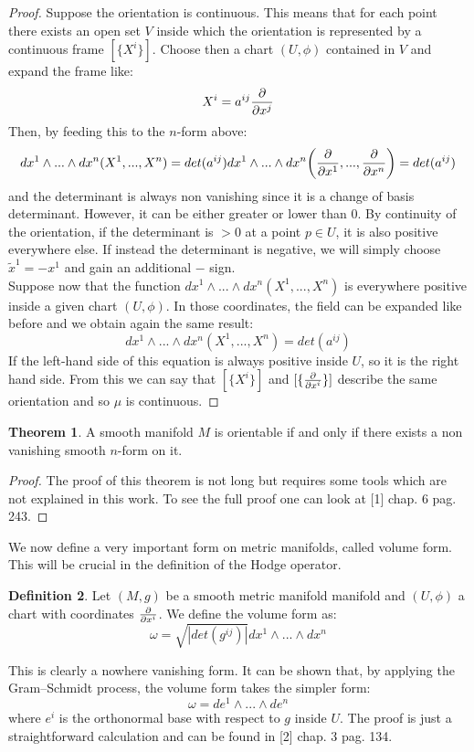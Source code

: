 \documentclass[12pt,a4paper]{report}
\theoremstyle{definition}
\newtheorem{Def}{Definition}[chapter]
\theoremstyle{Theorem}
\newtheorem{Theo}[Def]{Theorem}
\theoremstyle{definition}
\theoremstyle{definition}
\begin{document}
	\begin{proof}
		Suppose the orientation is continuous. This means that for each point there exists an open set $V$ inside which the orientation is represented by a continuous frame $[\{X^i\}]$. Choose then a chart $(U,\phi)$ contained in $V$ and expand the frame like:
		$$X^i=a^{ij}{\partial\over \partial x^j}$$
		Then, by feeding this to the $n$-form above:
		$$dx^1\wedge...\wedge dx^n(X^1,...,X^n)=det(a^{ij})dx^1\wedge...\wedge dx^n\bigg({\partial\over \partial x^1},...,{\partial\over \partial x^n}\bigg)=det(a^{ij})$$
		and the determinant is always non vanishing since it is a change of basis determinant. However, it can be either greater or lower than 0. By continuity of the orientation, if the determinant is $>0$ at a point $p\in U$, it is also positive everywhere else. If instead the determinant is negative, we will simply choose $\tilde{x}^1=-x^1$ and gain an additional $-$ sign.\\
		Suppose now that the function $dx^1\wedge...\wedge dx^n(X^1,...,X^n)$ is everywhere positive inside a given chart $(U,\phi)$. In those coordinates, the field can be expanded like before and we obtain again the same result:
		$$dx^1\wedge...\wedge dx^n(X^1,...,X^n)=det(a^{ij})$$
		If the left-hand side of this equation is always positive inside $U$, so it is the right hand side. From this we can say that $[\{X^i\}]$ and $[\{{\partial\over\partial x^i}\}]$ describe the same orientation and so $\mu$ is continuous.
	\end{proof}
	\begin{Theo}
		A smooth manifold $M$ is orientable if and only if there exists a non vanishing smooth $n$-form on it.
	\end{Theo}
	\begin{proof}
		The proof of this theorem is not long but requires some tools which are not explained in this work. To see the full proof one can look at [1] chap. 6 pag. 243.
	\end{proof}
	We now define a very important form on metric manifolds, called volume form. This will be crucial in the definition of the Hodge operator.
	\begin{Def}
		Let $(M,g)$ be a smooth metric manifold manifold and $(U,\phi)$ a chart with coordinates $\partial\over \partial x^i$. We define the volume form as:
		$$\omega=\sqrt{|det(g^{ij})|}dx^1\wedge...\wedge dx^n$$
	\end{Def}
	This is clearly a nowhere vanishing form. It can be shown that, by applying the Gram–Schmidt process, the volume form takes the simpler form:
	$$\omega=de^1\wedge...\wedge de^n$$
	where $e^i$ is the orthonormal base with respect to $g$ inside $U$. The proof is just a straightforward calculation and can be found in [2] chap. 3 pag. 134.
\end{document}
